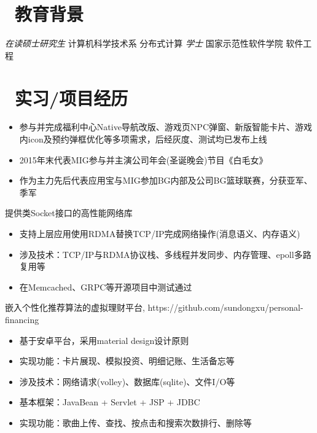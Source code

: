 \documentclass{resume}
\begin{document}
{\section{\faGraduationCap\  教育背景}
\normalsize
\textit{在读硕士研究生} \quad 计算机科学技术系 \quad 分布式计算
\normalsize
\textit{学士} \quad 国家示范性软件学院 \quad 软件工程 

\section{\faUsers\ 实习/项目经历}
\normalsize
{}
\begin{itemize}
  \item 参与并完成福利中心Native导航改版、游戏页NPC弹窗、新版智能卡片、游戏内icon及预约弹框优化等多项需求，后经灰度、测试均已发布上线
  \item 2015年末代表MIG参与并主演公司年会(圣诞晚会)节目《白毛女》
  \item 作为主力先后代表应用宝与MIG参加BG内部及公司BG篮球联赛，分获亚军、季军
\end{itemize}

\normalsize
{}
提供类Socket接口的高性能网络库
\begin{itemize}
  \item 支持上层应用使用RDMA替换TCP/IP完成网络操作(消息语义、内存语义)
  \item 涉及技术：TCP/IP与RDMA协议栈、多线程并发同步、内存管理、epoll多路复用等 
  \item 在Memcached、GRPC等开源项目中测试通过
\end{itemize}

\normalsize
{}
嵌入个性化推荐算法的虚拟理财平台, https://github.com/sundongxu/personal-financing
\begin{itemize}
  \item 基于安卓平台，采用material design设计原则
  \item 实现功能：卡片展现、模拟投资、明细记账、生活备忘等
  \item 涉及技术：网络请求(volley)、数据库(sqlite)、文件I/O等
\end{itemize}

\normalsize
{}
\begin{itemize}
  \item 基本框架：JavaBean + Servlet + JSP + JDBC
  \item 实现功能：歌曲上传、查找、按点击和搜索次数排行、删除等
\end{itemize}

}
\end{document}
